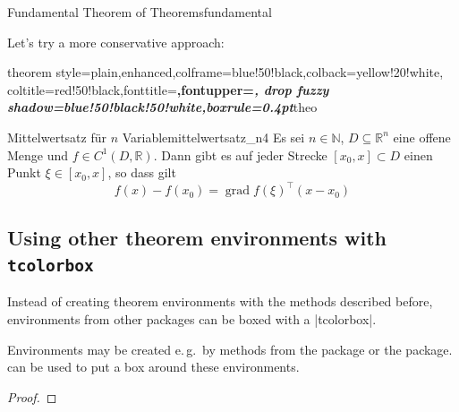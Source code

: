 \begin{dispExample}
\begin{Theorem}[enhanced,
    fuzzy halo=3mm with yellow,
    fuzzy halo=2mm with red,
    fuzzy halo=1mm with yellow,
    watermark color=red!35!white,
    watermark text={Overacting\\Fundamental Theorem}]%
  {Fundamental Theorem of Theorems}{fundamental}%
  \lipsum[1-2]
\end{Theorem}
\end{dispExample}

Let's try a more conservative approach:

\begin{dispExample}
%
  {theorem style=plain,enhanced,colframe=blue!50!black,colback=yellow!20!white,
   coltitle=red!50!black,fonttitle=\upshape\bfseries,fontupper=\itshape,
   drop fuzzy shadow=blue!50!black!50!white,boxrule=0.4pt}{theo}

\begin{YetAnotherTheorem}{Mittelwertsatz f\"{u}r $n$ Variable}{mittelwertsatz_n4}%
  Es sei $n\in\mathbb{N}$, $D\subseteq\mathbb{R}^n$ eine offene Menge und
  $f\in C^{1}(D,\mathbb{R})$. Dann gibt es auf jeder Strecke
  $[x_0,x]\subset D$ einen Punkt $\xi\in[x_0,x]$, so dass gilt
  \begin{equation*}
  f(x)-f(x_0) = \operatorname{grad} f(\xi)^{\top}(x-x_0)
  \end{equation*}
\end{YetAnotherTheorem}
\end{dispExample}


\clearpage
\subsection{Using other theorem environments with \texttt{tcolorbox}}\label{subsec:theorems_other}

Instead of creating theorem environments with the methods described before,
environments from other packages can be boxed with a |tcolorbox|.

Environments may be created e.\,g.\ by methods from the  package or
the  package.  can be used to put a box
around these environments.


\begin{dispExample}
\begin{lem}
  \lipsum[2]
\end{lem}

\lipsum[3]

\begin{proof}
  \lipsum*[4]
\end{proof}
\end{dispExample}
